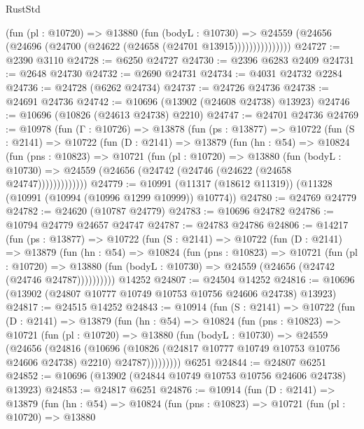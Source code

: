 \begin{lexlean}{RustStd}
\begin{coremodule}
                  (fun (pl : @10720) =>
                  @13880
                    (fun (bodyL : @10730) =>
                    @24559 (@24656 (@24696 (@24700 (@24622 (@24658 (@24701 @13915)))))))))))))))
@24727 := @2390 @3110
@24728 := @6250 @24727
@24730 := @2396 @6283 @2409
@24731 := @2648 @24730
@24732 := @2690 @24731
@24734 := @4031 @24732 @2284
@24736 := @24728 (@6262 @24734)
@24737 := @24726 @24736
@24738 := @24691 @24736
@24742 := @10696 (@13902 (@24608 @24738) @13923)
@24746 := @10696 (@10826 (@24613 @24738) @2210)
@24747 := @24701 @24736
@24769 := @10978
    (fun (Γ : @10726) =>
    @13878
      (fun (ps : @13877) =>
      @10722
        (fun (S : @2141) =>
        @10722
          (fun (D : @2141) =>
          @13879
            (fun (hn : @54) =>
            @10824
              (fun (pns : @10823) =>
              @10721
                (fun (pl : @10720) =>
                @13880
                  (fun (bodyL : @10730) =>
                  @24559 (@24656 (@24742 (@24746 (@24622 (@24658 @24747)))))))))))))
@24779 := @10991 (@11317 (@18612 @11319)) (@11328 (@10991 (@10994 (@10996 @1299 @10999)) @10774))
@24780 := @24769 @24779
@24782 := @24620 (@10787 @24779)
@24783 := @10696 @24782
@24786 := @10794 @24779 @24657 @24747
@24787 := @24783 @24786
@24806 := @14217
    (fun (ps : @13877) =>
    @10722
      (fun (S : @2141) =>
      @10722
        (fun (D : @2141) =>
        @13879
          (fun (hn : @54) =>
          @10824
            (fun (pns : @10823) =>
            @10721
              (fun (pl : @10720) =>
              @13880 (fun (bodyL : @10730) => @24559 (@24656 (@24742 (@24746 @24787))))))))))
    @14252
@24807 := @24504 @14252
@24816 := @10696 (@13902 (@24807 @10777 @10749 @10753 @10756 @24606 @24738) @13923)
@24817 := @24515 @14252
@24843 := @10914
    (fun (S : @2141) =>
    @10722
      (fun (D : @2141) =>
      @13879
        (fun (hn : @54) =>
        @10824
          (fun (pns : @10823) =>
          @10721
            (fun (pl : @10720) =>
            @13880
              (fun (bodyL : @10730) =>
              @24559
                (@24656
                  (@24816
                    (@10696
                      (@10826 (@24817 @10777 @10749 @10753 @10756 @24606 @24738) @2210)
                      @24787)))))))))
    @6251
@24844 := @24807 @6251
@24852 := @10696 (@13902 (@24844 @10749 @10753 @10756 @24606 @24738) @13923)
@24853 := @24817 @6251
@24876 := @10914
    (fun (D : @2141) =>
    @13879
      (fun (hn : @54) =>
      @10824
        (fun (pns : @10823) =>
        @10721
          (fun (pl : @10720) =>
          @13880

\end{coremodule}
\end{lexlean}
